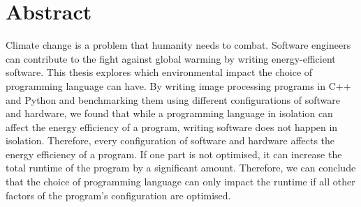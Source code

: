 \chapter*{Abstract}

Climate change is a problem that humanity needs to combat.
Software engineers can contribute to the fight against global warming by writing energy-efficient software.
This thesis explores which environmental impact the choice of programming language can have.
By writing image processing programs in C++ and Python and benchmarking them using different configurations of software and
hardware, we found that while a programming language in isolation can affect the energy efficiency of a program,
writing software does not happen in isolation.
Therefore, every configuration of software and hardware affects the energy efficiency of a program.
If one part is not optimised, it can increase the total runtime of the program by a significant amount.
Therefore, we can conclude that the choice of programming language can only impact the runtime if all other factors of the program's configuration are optimised.
